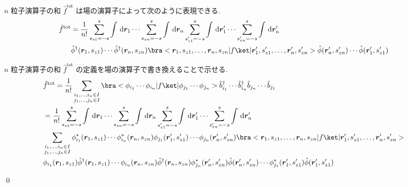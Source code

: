 \documentclass[uplatex,dvipdfmx,a4paper,11pt]{jlreq}
\makeatletter
\newcommand{\rr}{\bm{r}}
\numberwithin{equation}{section}
\theoremstyle{definition}
\renewenvironment{proof}[1][\proofname]{\par
  \normalfont
  \topsep6\p@\@plus6\p@ \trivlist
  \item[\hskip\labelsep{\bfseries #1}\@addpunct{\bfseries}]\ignorespaces\quad\par
}{
  \qed\endtrivlist\@endpefalse
}
\renewcommand\proofname{証明}
\makeatother
\begin{document}
\begin{theorem}
  $n$ 粒子演算子の和 $\hat{f}^{\mathrm{tot}}$ は場の演算子によって次のように表現できる.
  \begin{align}
    \hat{f}^{\mathrm{tot}} & = \frac{1}{n!}\sum_{s_{z1} = -s}^s\int\dl{\rr_1}\cdots\sum_{s_{zn} = -s}^s\int\dl{\rr_n}\sum_{s_{z1}' = -s}^s\int\dl{\rr_1'}\cdots\sum_{s_{zn}' = -s}^s\int\dl{\rr_n'}                                                \\
                           & \hat{\phi}^\dagger(\rr_1, s_{z1})\cdots\hat{\phi}^\dagger(\rr_n, s_{zn})\bra<\rr_1,s_{z1},\ldots,\rr_n,s_{zn}|f\ket|\rr_1',s_{z1}',\ldots,\rr_n',s_{zn}'>\hat{\phi}(\rr_n', s_{zn}')\cdots\hat{\phi}(\rr_1', s_{z1}')
  \end{align}
\end{theorem}
\begin{proof}
  $n$ 粒子演算子の和 $\hat{f}^{\mathrm{tot}}$ の定義を場の演算子で書き換えることで示せる.
  \begin{align}
     & \hat{f}^{\mathrm{tot}} = \frac{1}{n!}\sum_{\substack{i_1,\ldots,i_n\in I                                                                                                                                                                         \\ j_1,\ldots,j_n\in I}}\bra<\phi_{i_1}\cdots\phi_{i_n}|f\ket|\phi_{j_1}\cdots\phi_{j_n}>\hat{b}_{i_1}^\dagger\cdots\hat{b}_{i_n}^\dagger\hat{b}_{j_n}\cdots\hat{b}_{j_1} \\
     & = \frac{1}{n!}\sum_{s_{z1} = -s}^s\int\dl{\rr_1}\cdots\sum_{s_{zn} = -s}^s\int\dl{\rr_n}\sum_{s_{z1}' = -s}^s\int\dl{\rr_1'}\cdots\sum_{s_{zn}' = -s}^s\int\dl{\rr_n'}                                                                           \\
     & \sum_{\substack{i_1,\ldots,i_n\in I                                                                                                                                                                                                              \\ j_1,\ldots,j_n\in I}}\phi_{i_1}^*(\rr_1,s_{z1})\cdots\phi_{i_n}^*(\rr_n,s_{zn})\phi_{j_1}(\rr_1',s_{z1}')\cdots\phi_{j_n}(\rr_n',s_{zn}')\bra<\rr_1,s_{z1},\ldots,\rr_n,s_{zn}|f\ket|\rr_1',s_{z1}',\ldots,\rr_n',s_{zn}'>                                                                                                                                               \\
     & \phi_{i_1}(\rr_1, s_{z1})\hat{\phi}^\dagger(\rr_1, s_{z1})\cdots\phi_{i_n}(\rr_n, s_{zn})\hat{\phi}^\dagger(\rr_n, s_{zn})\phi_{j_n}^*(\rr_n', s_{zn}')\hat{\phi}(\rr_n', s_{zn}')\cdots\phi_{j_1}^*(\rr_1', s_{z1}')\hat{\phi}(\rr_1', s_{z1}') \\

\end{align}
\end{proof}
\end{document}
